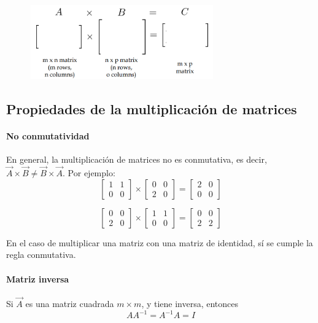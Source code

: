 \begin{figure}[h]
\centering
\includegraphics[width = 0.7\textwidth]{figs/matrix-matrix-mult.png}
\end{figure}

\subsection{Propiedades de la multiplicación de matrices}
\paragraph{No conmutatividad} En general, la multiplicación de matrices no es conmutativa, es decir, $\vec{A} \times \vec{B} \neq \vec{B} \times \vec{A}$. Por ejemplo:
$$\begin{bmatrix}
1 & 1 \\ 0 & 0
\end{bmatrix} \times \begin{bmatrix}
0 & 0 \\ 2 & 0
\end{bmatrix} = \begin{bmatrix}
2 & 0 \\ 0 & 0
\end{bmatrix} $$

$$\begin{bmatrix}
0 & 0 \\ 2 & 0
\end{bmatrix} \times \begin{bmatrix}
1 & 1 \\ 0 & 0
\end{bmatrix} = \begin{bmatrix}
0 & 0 \\ 2 & 2
\end{bmatrix} $$

En el caso de multiplicar una matriz con una matriz de identidad, sí se cumple la regla conmutativa.

\paragraph{Matriz inversa} Si $\vec{A}$ es una matriz cuadrada $m \times m$, y tiene inversa, entonces
$$AA^{-1} = A^{-1}A = I$$

